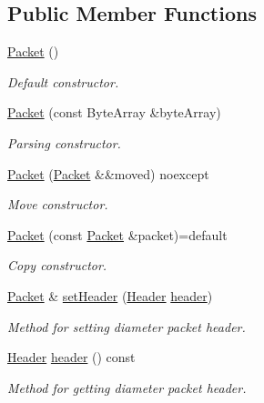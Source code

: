 \subsection*{Public Member Functions}
\begin{DoxyCompactItemize}
\item 
\mbox{\label{classDiameter_1_1Packet_a495c4db70c8a7f085076e07444d917c6}} 
\hyperlink{classDiameter_1_1Packet_a495c4db70c8a7f085076e07444d917c6}{Packet} ()
\begin{DoxyCompactList}\small\item\em Default constructor. \end{DoxyCompactList}\item 
\hyperlink{classDiameter_1_1Packet_a6d064316d887b5c9b99b6acfd2e2e54c}{Packet} (const Byte\+Array \&byte\+Array)
\begin{DoxyCompactList}\small\item\em Parsing constructor. \end{DoxyCompactList}\item 
\hyperlink{classDiameter_1_1Packet_a2bab0abbaf390210f24b0e4f9a10f58a}{Packet} (\hyperlink{classDiameter_1_1Packet}{Packet} \&\&moved) noexcept
\begin{DoxyCompactList}\small\item\em Move constructor. \end{DoxyCompactList}\item 
\hyperlink{classDiameter_1_1Packet_aadcbaa0411cf902d5e9b9e592765c25e}{Packet} (const \hyperlink{classDiameter_1_1Packet}{Packet} \&packet)=default
\begin{DoxyCompactList}\small\item\em Copy constructor. \end{DoxyCompactList}\item 
\hyperlink{classDiameter_1_1Packet}{Packet} \& \hyperlink{classDiameter_1_1Packet_ac37c0f3736cc87e553ecb7b60e6962b2}{set\+Header} (\hyperlink{classDiameter_1_1Packet_1_1Header}{Header} \hyperlink{classDiameter_1_1Packet_a9afb9a360694064175f2684bcd1668ce}{header})
\begin{DoxyCompactList}\small\item\em Method for setting diameter packet header. \end{DoxyCompactList}\item 
\hyperlink{classDiameter_1_1Packet_1_1Header}{Header} \hyperlink{classDiameter_1_1Packet_a9afb9a360694064175f2684bcd1668ce}{header} () const
\begin{DoxyCompactList}\small\item\em Method for getting diameter packet header. \end{DoxyCompactList}\item 

\end{DoxyCompactItemize}

